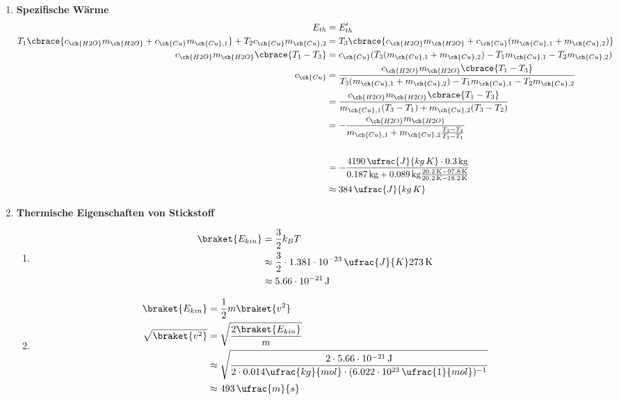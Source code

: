 \documentclass[11pt,letterpaper]{article}
\begin{document}
\begin{enumerate}
  \item \textbf{Spezifische Wärme}
    \begin{align*}
      E_{th} &= E'_{th}\\
      T_1 \cbrace{c_{\ch{H2O}}m_{\ch{H2O}} + c_{\ch{Cu}} m_{\ch{Cu},1}} + T_2 c_{\ch{Cu}} m_{\ch{Cu},2}&= 
      T_3 \cbrace{c_{\ch{H2O}}m_{\ch{H2O}} + c_{\ch{Cu}} (m_{\ch{Cu},1} + m_{\ch{Cu},2})}\\
      c_{\ch{H2O}}m_{\ch{H2O}} \cbrace{T_1 - T_3}&= 
      c_{\ch{Cu}} (T_3 (m_{\ch{Cu},1} + m_{\ch{Cu},2})- T_1 m_{\ch{Cu},1} - T_2 m_{\ch{Cu},2} )\\
      c_{\ch{Cu}}  &= \frac{c_{\ch{H2O}}m_{\ch{H2O}} \cbrace{T_1 - T_3}}{ T_3 (m_{\ch{Cu},1} + m_{\ch{Cu},2}) - T_1 m_{\ch{Cu},1} - T_2 m_{\ch{Cu},2} }\\
      &= \frac{c_{\ch{H2O}}m_{\ch{H2O}} \cbrace{T_1 - T_3}}
      {  m_{\ch{Cu},1}(T_3-T_1) + m_{\ch{Cu},2}(T_3-T_2) }\\
      &= -\frac{c_{\ch{H2O}}m_{\ch{H2O}} }
      {  m_{\ch{Cu},1} + m_{\ch{Cu},2}\frac{T_3-T_2}{T_3-T_1} }\\
      \\
      &= - \frac{4190 \,\ufrac{J}{kg\,K}\cdot 0.3\,\mathrm{kg}}{0.187\,\mathrm{kg} 
      + 0.089\,\mathrm{kg} \frac{20.2\,\mathrm{K}-97.8\,\mathrm{K}}{20.2\,\mathrm{K}-18.2\,\mathrm{K}}}\\
      &\approx 384\,\ufrac{J}{kg\,K}
    \end{align*}


  \item \textbf{Thermische Eigenschaften von Stickstoff}
    \begin{enumerate}
      \item
        \begin{align*}
          \braket{E_{kin}}&= \frac{3}{2}k_B T\\
          &\approx \frac{3}{2} \cdot 1.381\cdot 10^{-23}\,\ufrac{J}{K} 273\,\mathrm{K}\\
          &\approx 5.66  \cdot 10^{-21}\,\mathrm{J}
        \end{align*}

      \item
        \begin{align*}
          \braket{E_{kin}} &= \frac{1}{2}m\braket{v^2}\\
          \sqrt{\braket{v^2}} &= \sqrt{\frac{2 \braket{E_{kin}}}{m}}\\
          &\approx \sqrt{\frac{2 \cdot  5.66  \cdot 10^{-21}\,\mathrm{J}}{2\cdot 0.014\ufrac{kg}{mol} \cdot (6.022\cdot 10^{23} \,\ufrac{1}{mol})^{-1}}}\\
          &\approx 493\,\ufrac{m}{s}
        \end{align*}


\end{enumerate}
\end{enumerate}
\end{document}
